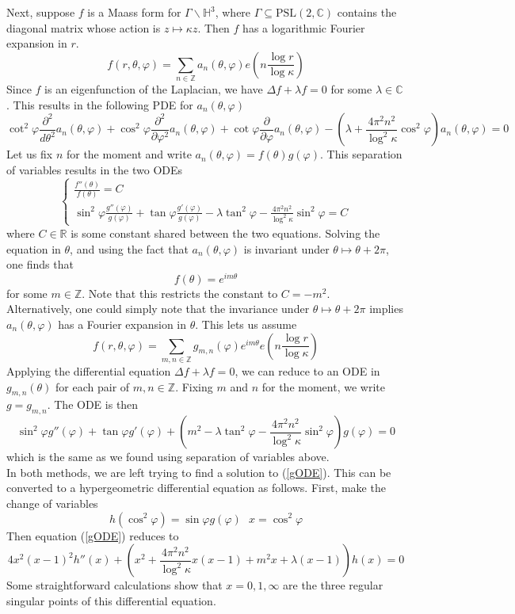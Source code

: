 \documentclass[]{article}
\begin{document}
Next, suppose $f$ is a Maass form for $\Gamma\backslash\mathbb{H}^3$, where $\Gamma \subseteq \text{PSL}(2, \mathbb{C})$ contains the diagonal matrix whose action is $z \mapsto \kappa z$.
Then $f$ has a logarithmic Fourier expansion in $r$.
$$
f(r, \theta, \varphi) =
\sum_{n \in \mathbb{Z}}a_n(\theta, \varphi)e\left(n\frac{\log r}{\log\kappa}\right)
$$
Since $f$ is an eigenfunction of the Laplacian, we have $\Delta f + \lambda f = 0$ for some $\lambda \in \mathbb{C}$.
This results in the following PDE for $a_n(\theta, \varphi)$
$$
\cot^2\varphi\frac{\partial^2}{d\theta^2}a_n(\theta, \varphi) + \cos^2\varphi\frac{\partial^2}{\partial\varphi^2}a_n(\theta, \varphi) + \cot\varphi\frac{\partial}{\partial\varphi}a_n(\theta, \varphi) - \left( \lambda + \frac{4\pi^2n^2}{\log^2\kappa}\cos^2\varphi \right)a_n(\theta, \varphi) = 0
$$
Let us fix $n$ for the moment and write $a_n(\theta, \varphi) = f(\theta)g(\varphi)$.
This separation of variables results in the two ODEs
$$
\begin{cases}
\frac{f''(\theta)}{f(\theta)} = C \\
\sin^2\varphi\frac{g''(\varphi)}{g(\varphi)} + \tan\varphi\frac{g'(\varphi)}{g(\varphi)} - \lambda\tan^2\varphi - \frac{4\pi^2n^2}{\log^2\kappa}\sin^2\varphi = C
\end{cases}
$$
where $C \in \mathbb{R}$ is some constant shared between the two equations.
Solving the equation in $\theta$, and using the fact that $a_n(\theta, \varphi)$ is invariant under $\theta \mapsto \theta + 2\pi$, one finds that
$$
f(\theta) = e^{im\theta}
$$
for some $m \in \mathbb{Z}$.
Note that this restricts the constant to $C = -m^2$.
\\

Alternatively, one could simply note that the invariance under $\theta \mapsto \theta + 2\pi$ implies $a_n(\theta, \varphi)$ has a Fourier expansion in $\theta$.
This lets us assume
$$
f(r, \theta, \varphi) = \sum_{m, n \in \mathbb{Z}}g_{m, n}(\varphi)e^{im\theta}e\left(n\frac{\log r}{\log\kappa}\right)
$$
Applying the differential equation $\Delta f + \lambda f = 0$, we can reduce to an ODE in $g_{m, n}(\theta)$ for each pair of $m, n \in \mathbb{Z}$.
Fixing $m$ and $n$ for the moment, we write $g = g_{m,n}$.
The ODE is then
\begin{equation}\label{gODE}
\sin^2\varphi g''(\varphi) + \tan\varphi g'(\varphi) + \left(m^2 - \lambda\tan^2\varphi - \frac{4\pi^2n^2}{\log^2\kappa}\sin^2\varphi\right)g(\varphi) = 0
\end{equation}
which is the same as we found using separation of variables above.
\\

In both methods, we are left trying to find a solution to (\ref{gODE}).
This can be converted to a hypergeometric differential equation as follows.
First, make the change of variables
$$
h(\cos^2\varphi) = \sin\varphi g(\varphi) ~~~ x = \cos^2\varphi
$$
Then equation (\ref{gODE}) reduces to
$$
4x^2(x - 1)^2h''(x) + \left( x^2 + \frac{4\pi^2n^2}{\log^2\kappa}x(x - 1) + m^2x + \lambda(x - 1) \right)h(x) = 0
$$
Some straightforward calculations show that $x = 0, 1, \infty$ are the three regular singular points of this differential equation.
\end{document}

